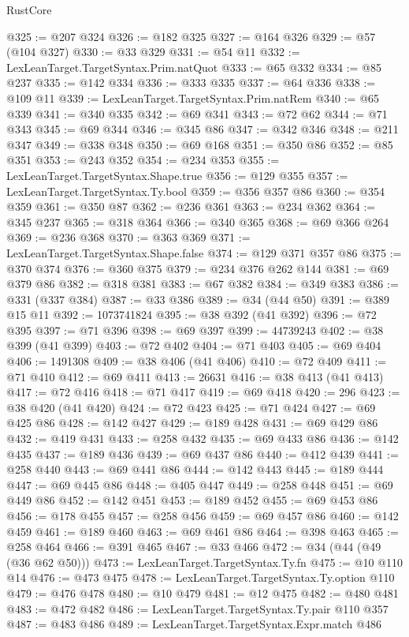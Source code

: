 \begin{lexlean}{RustCore}
\begin{coremodule}
@325 := @207 @324
@326 := @182 @325
@327 := @164 @326
@329 := @57 (@104 @327)
@330 := @33 @329
@331 := @54 @11
@332 := LexLeanTarget.TargetSyntax.Prim.natQuot
@333 := @65 @332
@334 := @85 @237
@335 := @142 @334
@336 := @333 @335
@337 := @64 @336
@338 := @109 @11
@339 := LexLeanTarget.TargetSyntax.Prim.natRem
@340 := @65 @339
@341 := @340 @335
@342 := @69 @341
@343 := @72 @62
@344 := @71 @343
@345 := @69 @344
@346 := @345 @86
@347 := @342 @346
@348 := @211 @347
@349 := @338 @348
@350 := @69 @168
@351 := @350 @86
@352 := @85 @351
@353 := @243 @352
@354 := @234 @353
@355 := LexLeanTarget.TargetSyntax.Shape.true
@356 := @129 @355
@357 := LexLeanTarget.TargetSyntax.Ty.bool
@359 := @356 @357 @86
@360 := @354 @359
@361 := @350 @87
@362 := @236 @361
@363 := @234 @362
@364 := @345 @237
@365 := @318 @364
@366 := @340 @365
@368 := @69 @366 @264
@369 := @236 @368
@370 := @363 @369
@371 := LexLeanTarget.TargetSyntax.Shape.false
@374 := @129 @371 @357 @86
@375 := @370 @374
@376 := @360 @375
@379 := @234 @376 @262 @144
@381 := @69 @379 @86
@382 := @318 @381
@383 := @67 @382
@384 := @349 @383
@386 := @331 (@337 @384)
@387 := @33 @386
@389 := @34 (@44 @50)
@391 := @389 @15 @11
@392 := 1073741824
@395 := @38 @392 (@41 @392)
@396 := @72 @395
@397 := @71 @396
@398 := @69 @397
@399 := 44739243
@402 := @38 @399 (@41 @399)
@403 := @72 @402
@404 := @71 @403
@405 := @69 @404
@406 := 1491308
@409 := @38 @406 (@41 @406)
@410 := @72 @409
@411 := @71 @410
@412 := @69 @411
@413 := 26631
@416 := @38 @413 (@41 @413)
@417 := @72 @416
@418 := @71 @417
@419 := @69 @418
@420 := 296
@423 := @38 @420 (@41 @420)
@424 := @72 @423
@425 := @71 @424
@427 := @69 @425 @86
@428 := @142 @427
@429 := @189 @428
@431 := @69 @429 @86
@432 := @419 @431
@433 := @258 @432
@435 := @69 @433 @86
@436 := @142 @435
@437 := @189 @436
@439 := @69 @437 @86
@440 := @412 @439
@441 := @258 @440
@443 := @69 @441 @86
@444 := @142 @443
@445 := @189 @444
@447 := @69 @445 @86
@448 := @405 @447
@449 := @258 @448
@451 := @69 @449 @86
@452 := @142 @451
@453 := @189 @452
@455 := @69 @453 @86
@456 := @178 @455
@457 := @258 @456
@459 := @69 @457 @86
@460 := @142 @459
@461 := @189 @460
@463 := @69 @461 @86
@464 := @398 @463
@465 := @258 @464
@466 := @391 @465
@467 := @33 @466
@472 := @34 (@44 (@49 (@36 @62 @50)))
@473 := LexLeanTarget.TargetSyntax.Ty.fn
@475 := @10 @110 @14
@476 := @473 @475
@478 := LexLeanTarget.TargetSyntax.Ty.option @110
@479 := @476 @478
@480 := @10 @479
@481 := @12 @475
@482 := @480 @481
@483 := @472 @482
@486 := LexLeanTarget.TargetSyntax.Ty.pair @110 @357
@487 := @483 @486
@489 := LexLeanTarget.TargetSyntax.Expr.match @486

\end{coremodule}
\end{lexlean}
